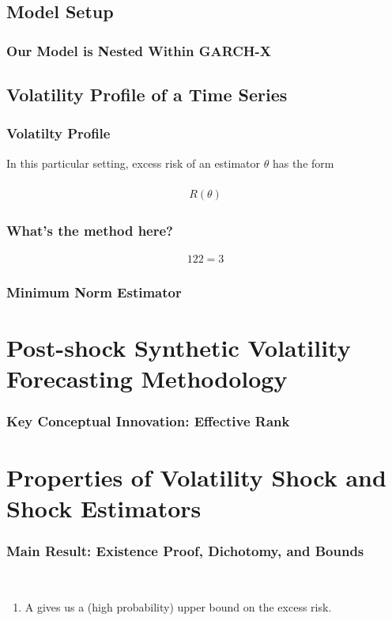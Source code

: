\documentclass{beamer}
\begin{document}
\subsection{Model Setup}

\begin{frame}
\frametitle{Our Model is Nested Within GARCH-X}

\end{frame}

\subsection{Volatility Profile of a Time Series}
\begin{frame}
\frametitle{Volatilty Profile}
In this particular setting, excess risk of an estimator $\theta$ has the form \\~\\

\begin{align*}
 R(\theta)
\end{align*}

\end{frame}

\begin{frame}
\frametitle{What's the method here?}
    \begin{alignat*}{12}
    2 = 3
    \end{alignat*}

\end{frame}

\begin{frame}
\frametitle{Minimum Norm Estimator}

\end{frame}

\section{Post-shock Synthetic Volatility Forecasting Methodology}

\begin{frame}
\frametitle{Key Conceptual Innovation: Effective Rank}

\end{frame}
\section{Properties of Volatility Shock and Shock Estimators}

\begin{frame}
\frametitle{Main Result: Existence Proof, Dichotomy, and Bounds}

\\
\begin{enumerate}
\item<3-7> A gives us a (high probability) upper bound on the excess risk.

\end{enumerate}
\end{frame}
\end{document}
